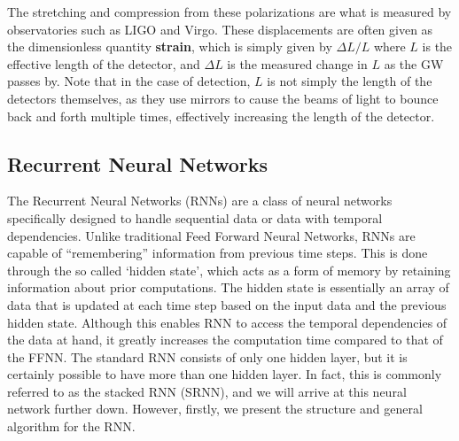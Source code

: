 \documentclass[%
reprint,
amsmath,amssymb,
aps,
]{revtex4-2}
\begin{document}
The stretching and compression from these polarizations are what is measured by observatories such as LIGO and Virgo. These displacements are often given as the dimensionless quantity \textbf{strain}, which is simply given by $\Delta L/L$ where $L$ is the effective length of the detector, and $\Delta L$ is the measured change in $L$ as the GW passes by. Note that in the case of detection, $L$ is not simply the length of the detectors themselves, as they use mirrors to cause the beams of light to bounce back and forth multiple times, effectively increasing the length of the detector.


\subsection{Recurrent Neural Networks}	\label{{sec:RNNs}}
The Recurrent Neural Networks (RNNs) are a class of neural networks specifically designed to handle sequential data or data with temporal dependencies. Unlike traditional Feed Forward Neural Networks, RNNs are capable of ``remembering'' information from previous time steps. This is done through the so called `hidden state', which acts as a form of memory by retaining information about prior computations. The hidden state is essentially an array of data that is updated at each time step based on the input data and the previous hidden state. Although this enables RNN to access the temporal dependencies of the data at hand, it greatly increases the computation time compared to that of the FFNN. The standard RNN consists of only one hidden layer, but it is certainly possible to have more than one hidden layer. In fact, this is commonly referred to as the stacked RNN (SRNN), and we will arrive at this neural network further down. However, firstly, we present the structure and general algorithm for the RNN.
\end{document}
